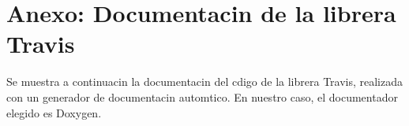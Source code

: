 \appendix

\chapter{Anexo: Documentacin de la librera Travis}

{\Large Se muestra a continuacin la documentacin del cdigo de la librera Travis, realizada con un generador de documentacin automtico. En nuestro caso, el documentador elegido es Doxygen.}
